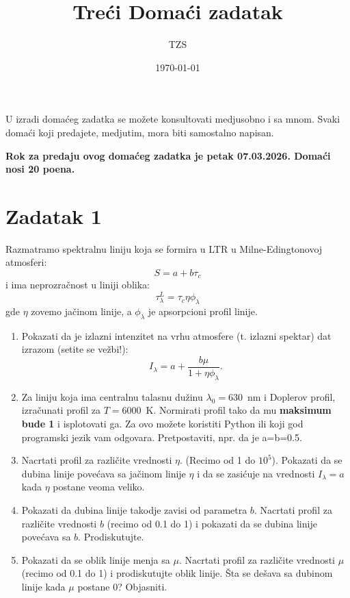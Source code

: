 \documentclass[12pt]{article}
\title{Tre\'{c}i Doma\'{c}i zadatak}
\author{TZS}
\date{\today}
\begin{document}
\maketitle

U izradi doma\'{c}eg zadatka se mo\v{z}ete konsultovati medjusobno i sa mnom. Svaki doma\'{c}i koji predajete, medjutim, mora biti samostalno napisan. 

\textbf{Rok za predaju ovog doma\'{c}eg zadatka je petak 07.03.2026. Doma\'{c}i nosi 20 poena.}

\section*{Zadatak 1}

Razmatramo spektralnu liniju koja se formira u LTR u Milne-Edingtonovoj atmosferi:
\begin{equation}
S = a + b\tau_c
\end{equation}
i ima neprozra\v{c}nost u liniji oblika: 
\begin{equation}
\tau_\lambda^L = \tau_c \eta \phi_\lambda
\end{equation}
gde $\eta$ zovemo ja\v{c}inom linije, a $\phi_\lambda$ je apsorpcioni profil linije.

\begin{enumerate}
    
    
    \item Pokazati da je izlazni intenzitet na vrhu atmosfere (t. izlazni spektar) dat izrazom (setite se ve\v{z}bi!): 
    \begin{equation}
    I_\lambda = a + \frac{b\mu}{1 + \eta \phi_\lambda}.
    \end{equation}

    \item Za liniju koja ima centralnu talasnu du\v{z}inu $\lambda_0=630$~nm i Doplerov profil, izra\v{c}unati profil za $T=6000$~K. Normirati profil tako da mu \textbf{maksimum bude 1} i isplotovati ga. Za ovo mo\v{z}ete koristiti Python ili koji god programski jezik vam odgovara. Pretpostaviti, npr. da je a=b=0.5.

    \item Nacrtati profil za razli\v{c}ite vrednosti $\eta$. (Recimo od 1 do $10^5$). Pokazati da se dubina linije povećava sa jačinom linije $\eta$ i da se zasićuje na vrednosti $I_\lambda=a$ kada $\eta$ postane veoma veliko.

    \item Pokazati da dubina linije takodje zavisi od parametra $b$. Nacrtati profil za različite vrednosti $b$ (recimo od 0.1 do 1) i pokazati da se dubina linije povećava sa $b$. Prodiskutujte.

    \item Pokazati da se oblik linije menja sa $\mu$. Nacrtati profil za različite vrednosti $\mu$ (recimo od 0.1 do 1) i prodiskutujte oblik linije. \v{S}ta se de\v{s}ava sa dubinom linije kada $\mu$ postane 0? Objasniti.
\end{enumerate}
\end{document}
